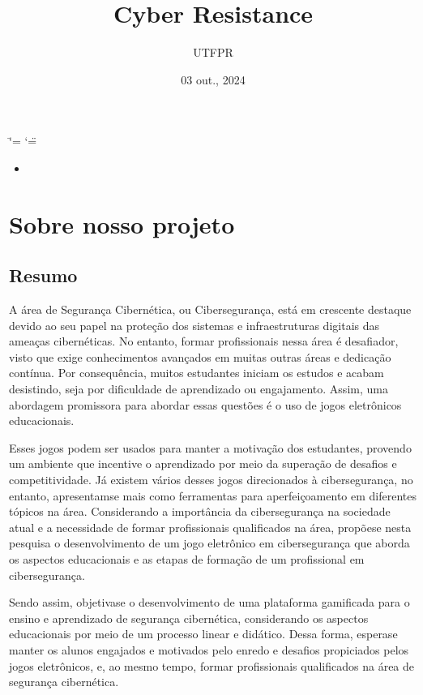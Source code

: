 \documentclass[letterpaper,10pt,portuges]{sphinxmanual}
\title{Cyber Resistance}
\date{03 out., 2024}
\author{UTFPR}
\begin{document}
\ifdefined\shorthandoff
  \ifnum\catcode`\=\string=\active\shorthandoff{=}\fi
  \ifnum\catcode`\"=\active{}\fi
\fi

\pagestyle{empty}
\sphinxmaketitle
\pagestyle{plain}
\sphinxtableofcontents
\pagestyle{normal}
\label{\detokenize{index::doc}}

\begin{itemize}
\item {} 
\sphinxAtStartPar
{}

\end{itemize}

\sphinxstepscope


\chapter{Sobre nosso projeto}
\label{\detokenize{about:sobre-nosso-projeto}}\label{\detokenize{about::doc}}

\section{Resumo}
\label{\detokenize{about:resumo}}
\sphinxAtStartPar
A área de Segurança Cibernética, ou Cibersegurança, está em crescente destaque devido ao seu papel na proteção dos sistemas e infraestruturas digitais das ameaças cibernéticas. No entanto, formar profissionais nessa área é desafiador, visto que exige conhecimentos avançados em muitas outras áreas e dedicação contínua. Por consequência, muitos estudantes iniciam os estudos e acabam desistindo, seja por dificuldade de aprendizado ou engajamento. Assim, uma abordagem promissora para abordar essas questões é o uso de jogos eletrônicos educacionais.

\sphinxAtStartPar
Esses jogos podem ser usados para manter a motivação dos estudantes, provendo um ambiente que incentive o aprendizado por meio da superação de desafios e competitividade. Já existem vários desses jogos direcionados à cibersegurança, no entanto, apresentam\sphinxhyphen{}se mais como ferramentas para aperfeiçoamento em diferentes tópicos na área. Considerando a importância da cibersegurança na sociedade atual e a necessidade de formar profissionais qualificados na área, propõe\sphinxhyphen{}se nesta pesquisa o desenvolvimento de um jogo eletrônico em cibersegurança que aborda os aspectos educacionais e as etapas de formação de um profissional em cibersegurança.

\sphinxAtStartPar
Sendo assim, objetiva\sphinxhyphen{}se o desenvolvimento de uma plataforma gamificada para o ensino e aprendizado de segurança cibernética, considerando os aspectos educacionais por meio de um processo linear e didático. Dessa forma, espera\sphinxhyphen{}se manter os alunos engajados e motivados pelo enredo e desafios propiciados pelos jogos eletrônicos, e, ao mesmo tempo, formar profissionais qualificados na área de segurança cibernética.
\end{document}
